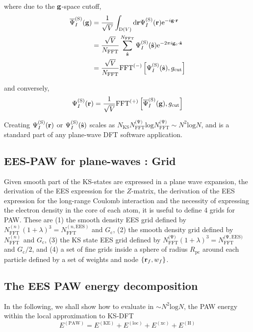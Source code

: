\documentclass[paper=a4, fontsize=11pt]{article} %
\numberwithin{equation}{section} %
\numberwithin{figure}{section} %
\numberwithin{table}{section} %
\newcommand{\ol}{\overline}
\newcommand{\bs}{{\bf{s}}}
\newcommand{\bg}{{\bf{g}}}
\newcommand{\br}{{\bf{r}}}
\newcommand{\hs}{{\hat{\bf{s}}}}
\newcommand{\rS}{{\mathrm{S}}}
\newcommand{\rKE}{{\mathrm{KE}}}
\newcommand{\rEES}{{\mathrm{EES}}}
\newcommand{\rxc}{{\mathrm{xc}}}
\newcommand{\rcut}{{\mathrm{cut}}}
\newcommand{\re}{{\mathrm{e}}}
\newcommand{\rP}{{\mathrm{PAW}}}
\newcommand{\rd}{{\mathrm{d}}}
\newcommand{\rH}{{\mathrm{H}}}
\newcommand{\rD}{{\mathrm{D}}}
\newcommand{\rlo}{{\mathrm{loc}}}
\newcommand{\rl}{{\mathrm{log}}}
\newcommand{\ibgr}{i\bg\cdot\br}
\newcommand{\gc}{{\bg_c}}
\newcommand{\igcs}{2\pi i\gc\cdot\hat \bs}
\newcommand{\psigs}{{\overline \Psi_I^{(\rS)}(\bg)}}
\newcommand{\NKS}{{N_{\mathrm{KS}}}}
\newcommand{\NFFT}{{N_{\mathrm{FFT}}}}
\newcommand{\NFFTn}{{N^{(n)}_{\mathrm{FFT}}}}
\newcommand{\NFFTp}{{N^{\mathrm{(\Psi})}_{\mathrm{FFT}}}}
\newcommand{\NFFTnEES}{{N^{(n,\rEES)}_{\mathrm{FFT}}}}
\newcommand{\NFFTpEES}{{N^{\mathrm{(\Psi,\rEES})}_{\mathrm{FFT}}}}
\newcommand{\Gc}{{G_{\mathrm{c}}}}
\newcommand{\Rpc}{{R_{\mathrm{pc}}}}
\begin{document}
where due to the $\bg$-space cutoff,
\begin{equation}
\begin{split}
\psigs
&= \frac{1}{\sqrt V} \int _{\rD(V)} \rd \br \Psi_I^{(\rS)}(\br) \re^{-\ibgr} \\
&= \frac{\sqrt{V}} {N_{\mathrm{FFT}}} \sum_{\hs}^\NFFT \Psi_I^{(\rS)}(\hs)\re^{-\igcs} \\
&=\frac{\sqrt{V}} {N_{\mathrm{FFT}}} \mathrm{FFT}^{(-)}\left[\Psi_I^{(\rS)}(\hs), g_\rcut\right]\\
\end{split}
\end{equation}

and conversely,
\begin{equation}
\Psi_I^{(\rS)}(\br) = \frac{1}{\sqrt{V}} \mathrm{FFT}^{(+)}\left[\ol \Psi_I^{(\rS)}(\bg), g_\rcut\right]
\end{equation}



Creating $\Psi_I^{(\rS)}(\br)$ or $\Psi_I^{(\rS)}(\hat \bs)$ scales as $\NKS \NFFTp \rl \NFFTp \sim N^2 \rl N$, and is a standard part of any plane-wave DFT software application.\\

\subsection{EES-PAW for plane-waves : Grid}

Given smooth part of the KS-states are expressed in a plane wave expansion, the derivation of the EES expression for the $Z$-matrix, the derivation of the EES expression for the long-range Coulomb interaction and the necessity of expressing the electron density in the core of each atom, it is useful to define 4 grids for PAW.  These are (1) the smooth density EES grid defined by $\NFFTn(1+\lambda)^3=\NFFTnEES$ and $\Gc$, (2) the smooth density grid defined by $\NFFTn$ and $\Gc$, (3) the KS state EES grid defined by $\NFFTp(1+\lambda)^3=\NFFTpEES$ and $\Gc/2$, and (4) a set of fine grids inside a sphere  of radius $\Rpc$ around each particle defined by a set of weights and node $\{\br_f,w_f\}$. \\

\subsection{The EES PAW energy decomposition}

In the following, we shall show how to evaluate in $\sim N^2 \rl N$, the PAW energy within the local approximation to KS-DFT
\begin{equation}
E^{(\rP)} = E^{(\rKE)} +  E^{(\rlo)} + E^{(\rxc)} + E^{(\rH)}
\end{equation}
\end{document}

